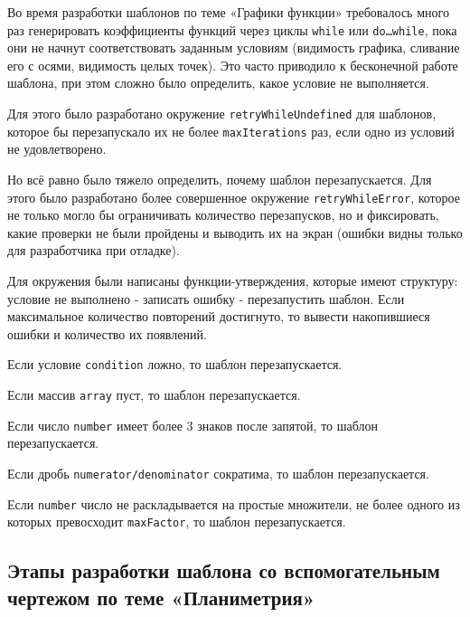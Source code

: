 Во время разработки шаблонов по теме «Графики функции» требовалось много раз генерировать коэффициенты функций через циклы 
\texttt{while} или \texttt{do\dots while}, пока они не начнут соответствовать заданным условиям (видимость графика, сливание его с осями, видимость целых точек). Это часто приводило к бесконечной работе шаблона, при этом сложно было определить, какое условие не выполняется.

Для этого было разработано окружение \texttt{retryWhileUndefined} для шаблонов, которое бы перезапускало их не более \texttt{maxIterations} раз, если одно из условий не удовлетворено. 


Но всё равно было тяжело определить, почему шаблон перезапускается. Для этого было разработано более совершенное окружение \texttt{retryWhileError}, которое не только могло бы ограничивать количество перезапусков, но и фиксировать, какие проверки не были пройдены и выводить их на экран (ошибки видны только для разработчика при отладке).


Для окружения были написаны функции-утверждения, которые имеют структуру: условие не выполнено - записать ошибку - перезапустить шаблон. Если максимальное количество повторений достигнуто, то вывести накопившиеся ошибки и количество их появлений. 

    Если условие \texttt{condition} ложно, то шаблон перезапускается. 

    Если массив \texttt{array} пуст, то шаблон перезапускается.

    Если число \texttt{number} имеет более 3 знаков после запятой, то шаблон перезапускается.
    
    Если дробь \texttt{numerator/denominator} сократима, то шаблон перезапускается.

    Если \texttt{number} число не раскладывается на простые множители, не более одного из которых превосходит \texttt{maxFactor}, то шаблон перезапускается. 

\subsection{Этапы разработки шаблона со вспомогательным чертежом по теме «Планиметрия»}

